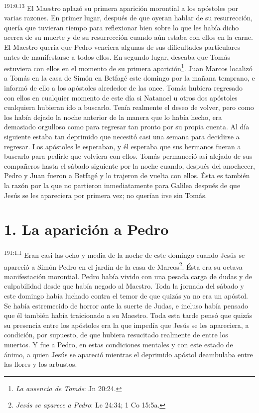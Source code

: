 \par 
\textsuperscript{191:0.13} El Maestro aplazó su primera aparición morontial a los apóstoles por varias razones. En primer lugar, después de que oyeran hablar de su resurrección, quería que tuvieran tiempo para reflexionar bien sobre lo que les había dicho acerca de su muerte y de su resurrección cuando aún estaba con ellos en la carne. El Maestro quería que Pedro venciera algunas de sus dificultades particulares antes de manifestarse a todos ellos. En segundo lugar, deseaba que Tomás estuviera con ellos en el momento de su primera aparición\footnote{\textit{La ausencia de Tomás}: Jn 20:24.}. Juan Marcos localizó a Tomás en la casa de Simón en Betfagé este domingo por la mañana temprano, e informó de ello a los apóstoles alrededor de las once. Tomás hubiera regresado con ellos en cualquier momento de este día si Natanael u otros dos apóstoles cualquiera hubieran ido a buscarlo. Tenía realmente el deseo de volver, pero como los había dejado la noche anterior de la manera que lo había hecho, era demasiado orgulloso como para regresar tan pronto por su propia cuenta. Al día siguiente estaba tan deprimido que necesitó casi una semana para decidirse a regresar. Los apóstoles le esperaban, y él esperaba que sus hermanos fueran a buscarlo para pedirle que volviera con ellos. Tomás permaneció así alejado de sus compañeros hasta el sábado siguiente por la noche cuando, después del anochecer, Pedro y Juan fueron a Betfagé y lo trajeron de vuelta con ellos. Ésta es también la razón por la que no partieron inmediatamente para Galilea después de que Jesús se les apareciera por primera vez; no querían irse sin Tomás.

\section*{1. La aparición a Pedro}
\par 
\textsuperscript{191:1.1} Eran casi las ocho y media de la noche de este domingo cuando Jesús se apareció a Simón Pedro en el jardín de la casa de Marcos\footnote{\textit{Jesús se aparece a Pedro}: Lc 24:34; 1 Co 15:5a.}. Ésta era su octava manifestación morontial. Pedro había vivido con una pesada carga de dudas y de culpabilidad desde que había negado al Maestro. Toda la jornada del sábado y este domingo había luchado contra el temor de que quizás ya no era un apóstol. Se había estremecido de horror ante la suerte de Judas, e incluso había pensado que él también había traicionado a su Maestro. Toda esta tarde pensó que quizás su presencia entre los apóstoles era la que impedía que Jesús se les apareciera, a condición, por supuesto, de que hubiera resucitado realmente de entre los muertos. Y fue a Pedro, en estas condiciones mentales y con este estado de ánimo, a quien Jesús se apareció mientras el deprimido apóstol deambulaba entre las flores y los arbustos.

